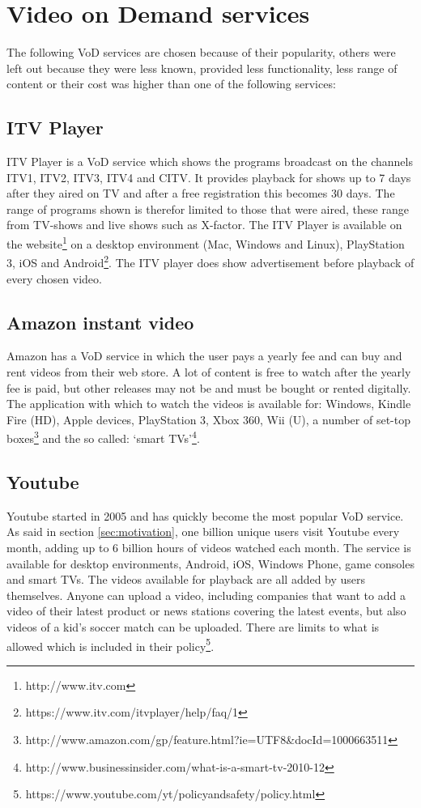 \section{Video on Demand services}
The following VoD services are chosen because of their popularity, others were left out because they were less known, provided less functionality, less range of content or their cost was higher than one of the following services:

\subsection{ITV Player}
ITV Player is a VoD service which shows the programs broadcast on the channels ITV1, ITV2, ITV3, ITV4 and CITV. It provides playback for shows up to 7 days after they aired on TV and after a free registration this becomes 30 days. The range of programs shown is therefor limited to those that were aired, these range from TV-shows and live shows such as X-factor. The ITV Player is available on the website\footnote{http://www.itv.com} on a desktop environment (Mac, Windows and Linux), PlayStation 3, iOS and Android\footnote{https://www.itv.com/itvplayer/help/faq/1}. The ITV player does show advertisement before playback of every chosen video.

\subsection{Amazon instant video}
Amazon has a VoD service in which the user pays a yearly fee and can buy and rent videos from their web store. A lot of content is free to watch after the yearly fee is paid, but other releases may not be and must be bought or rented digitally. The application with which to watch the videos is available for: Windows, Kindle Fire (HD), Apple devices, PlayStation 3, Xbox 360, Wii (U), a number of set-top boxes\footnote{http://www.amazon.com/gp/feature.html?ie=UTF8\&docId=1000663511} and the so called: `smart TVs'\footnote{http://www.businessinsider.com/what-is-a-smart-tv-2010-12}.

\subsection{Youtube}
Youtube started in 2005 and has quickly become the most popular VoD service. As said in section \ref{sec:motivation}, one billion unique users visit Youtube every month, adding up to 6 billion hours of videos watched each month. The service is available for desktop environments, Android, iOS, Windows Phone, game consoles and smart TVs. The videos available for playback are all added by users themselves. Anyone can upload a video, including companies that want to add a video of their latest product or news stations covering the latest events, but also videos of a kid's soccer match can be uploaded. There are limits to what is allowed which is included in their policy\footnote{https://www.youtube.com/yt/policyandsafety/policy.html}.


